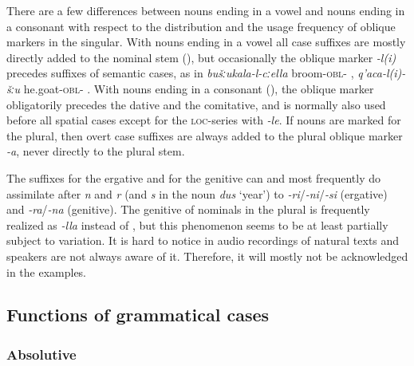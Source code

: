 There are a few differences between nouns ending in a vowel and nouns ending in a consonant with respect to the distribution and the usage frequency of oblique markers in the singular. With nouns ending in a vowel all case suffixes are mostly directly added to the nominal stem (), but occasionally the oblique marker \textit{-l(i)} precedes suffixes of semantic cases, as in \textit{bušːukala-l-cːella} broom-\textsc{obl}- , \textit{q'aca-l(i)-šːu} he.goat-\textsc{obl}- . With nouns ending in a consonant (), the oblique marker obligatorily precedes the dative and the comitative, and is normally also used before all spatial cases except for the \textsc{loc}-series with \textit{-le}. If nouns are marked for the plural, then overt case suffixes are always added to the plural oblique marker \textit{-a}, never directly to the plural stem.

The suffixes for the ergative and for the genitive can and most frequently do assimilate after \textit{n} and \textit{r} (and \textit{s} in the noun \textit{dus} `year') to \textit{-ri}/\textit{-ni}/\textit{-si} (ergative) and \textit{-ra}/\textit{-na} (genitive). The genitive of nominals in the plural is frequently realized as \textit{-lla} instead of , but this phenomenon seems to be at least partially subject to variation. It is hard to notice in audio recordings of natural texts and speakers are not always aware of it. Therefore, it will mostly not be acknowledged in the examples. 



\subsection{Functions of grammatical cases} 
\label{ssec:Functionsofgrammaticalcases}



\subsubsection{Absolutive}
\label{sssec:Absolutive}

